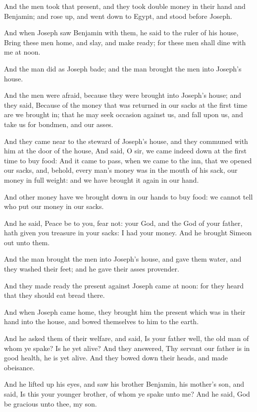 \verse And the men took that present, and they took double money in their hand and Benjamin; and rose up, and went down to Egypt, and stood before Joseph.

\verse And when Joseph saw Benjamin with them, he said to the ruler of his house, Bring these men home, and slay, and make ready; for these men shall dine with me at noon.

\verse And the man did as Joseph bade; and the man brought the men into Joseph's house.

\verse And the men were afraid, because they were brought into Joseph's house; and they said, Because of the money that was returned in our sacks at the first time are we brought in; that he may seek occasion against us, and fall upon us, and take us for bondmen, and our asses.

\verse And they came near to the steward of Joseph's house, and they communed with him at the door of the house, \verse And said, O sir, we came indeed down at the first time to buy food: \verse And it came to pass, when we came to the inn, that we opened our sacks, and, behold, every man's money was in the mouth of his sack, our money in full weight: and we have brought it again in our hand.

\verse And other money have we brought down in our hands to buy food: we cannot tell who put our money in our sacks.

\verse And he said, Peace be to you, fear not: your God, and the God of your father, hath given you treasure in your sacks: I had your money.  And he brought Simeon out unto them.

\verse And the man brought the men into Joseph's house, and gave them water, and they washed their feet; and he gave their asses provender.

\verse And they made ready the present against Joseph came at noon: for they heard that they should eat bread there.

\verse And when Joseph came home, they brought him the present which was in their hand into the house, and bowed themselves to him to the earth.

\verse And he asked them of their welfare, and said, Is your father well, the old man of whom ye spake? Is he yet alive?  \verse And they answered, Thy servant our father is in good health, he is yet alive.  And they bowed down their heads, and made obeisance.

\verse And he lifted up his eyes, and saw his brother Benjamin, his mother's son, and said, Is this your younger brother, of whom ye spake unto me? And he said, God be gracious unto thee, my son.

